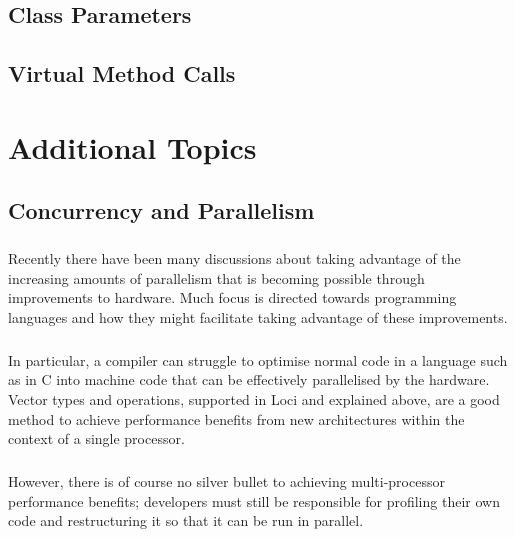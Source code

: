 \documentclass[12pt,twoside,notitlepage]{report}
\begin{document}
\section{Class Parameters}

\paragraph{}


\section{Virtual Method Calls}

\cleardoublepage

\chapter{Additional Topics}

\section{Concurrency and Parallelism}

\paragraph{}
Recently there have been many discussions about taking advantage of the increasing amounts of parallelism that is becoming possible through improvements to hardware. Much focus is directed towards programming languages and how they might facilitate taking advantage of these improvements.

\paragraph{}
In particular, a compiler can struggle to optimise normal code in a language such as in C into machine code that can be effectively parallelised by the hardware. Vector types and operations, supported in Loci and explained above, are a good method to achieve performance benefits from new architectures within the context of a single processor.

\paragraph{}
However, there is of course no silver bullet to achieving multi-processor performance benefits; developers must still be responsible for profiling their own code and restructuring it so that it can be run in parallel.
\end{document}
